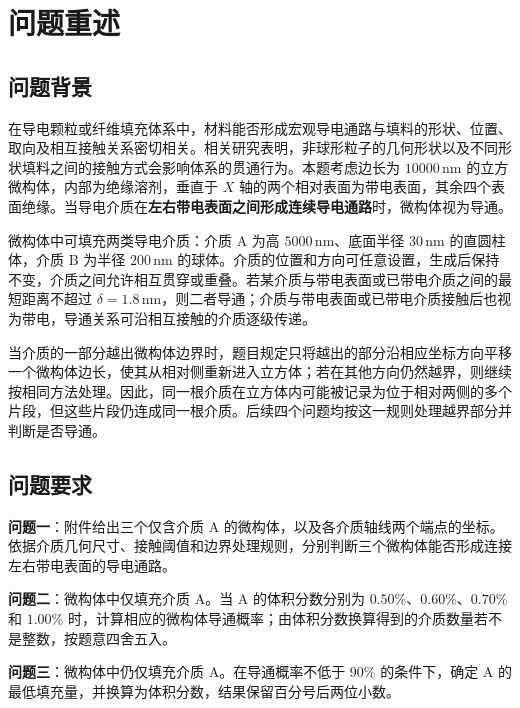 \documentclass[withoutpreface,bwprint]{cumcmthesis}
\begin{document}

\section{问题重述}

\subsection{问题背景}

在导电颗粒或纤维填充体系中，材料能否形成宏观导电通路与填料的形状、位置、取向及相互接触关系密切相关。相关研究表明，非球形粒子的几何形状以及不同形状填料之间的接触方式会影响体系的贯通行为\cite{garboczi1995overlap,li2007arbitraryShapes}。本题考虑边长为 $10000\,\mathrm{nm}$ 的立方微构体，内部为绝缘溶剂，垂直于 $X$ 轴的两个相对表面为带电表面，其余四个表面绝缘。当导电介质在\textbf{左右带电表面之间形成连续导电通路}时，微构体视为导通。

微构体中可填充两类导电介质：介质 A 为高 $5000\,\mathrm{nm}$、底面半径 $30\,\mathrm{nm}$ 的直圆柱体，介质 B 为半径 $200\,\mathrm{nm}$ 的球体。介质的位置和方向可任意设置，生成后保持不变，介质之间允许相互贯穿或重叠。若某介质与带电表面或已带电介质之间的最短距离不超过 $\delta=1.8\,\mathrm{nm}$，则二者导通；介质与带电表面或已带电介质接触后也视为带电，导通关系可沿相互接触的介质逐级传递。

当介质的一部分越出微构体边界时，题目规定只将越出的部分沿相应坐标方向平移一个微构体边长，使其从相对侧重新进入立方体；若在其他方向仍然越界，则继续按相同方法处理。因此，同一根介质在立方体内可能被记录为位于相对两侧的多个片段，但这些片段仍连成同一根介质。后续四个问题均按这一规则处理越界部分并判断是否导通。

\subsection{问题要求}

\textbf{问题一}：附件给出三个仅含介质 A 的微构体，以及各介质轴线两个端点的坐标。依据介质几何尺寸、接触阈值和边界处理规则，分别判断三个微构体能否形成连接左右带电表面的导电通路。

\textbf{问题二}：微构体中仅填充介质 A。当 A 的体积分数分别为 $0.50\%$、$0.60\%$、$0.70\%$ 和 $1.00\%$ 时，计算相应的微构体导通概率；由体积分数换算得到的介质数量若不是整数，按题意四舍五入。

\textbf{问题三}：微构体中仍仅填充介质 A。在导通概率不低于 $90\%$ 的条件下，确定 A 的最低填充量，并换算为体积分数，结果保留百分号后两位小数。
\end{document}

